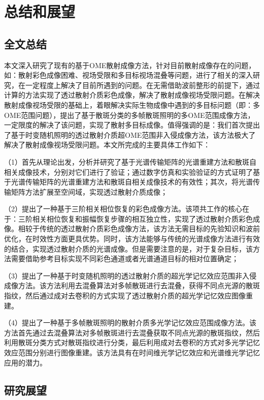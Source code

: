 \chapter{总结和展望}\label{chap:7}
\section{全文总结}
本文深入研究了现有的基于OME散射成像方法，针对目前散射成像存在的问题，如：散射彩色成像困难、视场受限和多目标视场混叠等问题，进行了相关的深入研究，在一定程度上解决了目前所遇到的问题。在无需借助波前整形的前提下，通过计算的方法实现了透过散射介质彩色成像，解决了散射成像视场受限问题。在解决散射成像视场受限的基础上，着眼解决实际生物成像中遇到的多目标问题（即：多OME范围问题），提出了基于散斑分类的多帧散斑照明的多OME范围成像方法，一定限度的解决了该问题，实现了散射多目标成像。值得强调的是：我们首次提出了基于时变随机照明的透过散射介质超OME范围非入侵成像方法，该方法极大了解决了散射成像视场受限问题。本文所完成的主要具体工作如下：

（1）首先从理论出发，分析并研究了基于光谱传输矩阵的光谱重建方法和散斑自相关成像技术，分别对它们进行了验证；通过数字仿真和实验验证的方式证明了基于光谱传输矩阵的光谱重建方法和散斑自相关成像技术的有效性；其次，将光谱传输矩阵方法扩展至空间域，实现透过散射介质成像；

（2）提出了一种基于三阶相关相位恢复的彩色成像方法。该项共工作的核心在于：三阶相关相位恢复和振幅恢复步骤的相互独立性，实现了透过散射介质彩色成像。相较于传统的透过散射介质彩色成像方法，该方法无需目标的先验知识和波前优化，在时效性方面更具优势。同时，该方法能够与传统的光谱成像方法进行有效的结合，实现透过散射介质的光谱成像。但是需要注意的是，对于复杂目标，该方法需要借助参考目标实现不同彩色通道或者光谱通道目标的相对位置确定；

（3）提出了一种基于时变随机照明的透过散射介质的超光学记忆效应范围非入侵成像方法。该方法利用去混叠算法对多帧散斑进行去混叠，获得不同点光源的散斑指纹，然后通过成对去卷积的方式实现了透过散射介质的超光学记忆效应图像重建。

（4）提出了一种基于多帧散斑照明的散射介质多光学记忆效应范围成像方法。该方法首先通过去混叠算法对多帧散斑进行去混叠获取不同点光源的散斑指纹，然后利用散斑分类方式对散斑指纹进行分类，最后利用成对去卷积的方式对多光学记忆效应范围分别进行图像重建。该方法具有在时间维光学记忆效应和光谱维光学记忆应用的潜力。

\section{研究展望}

